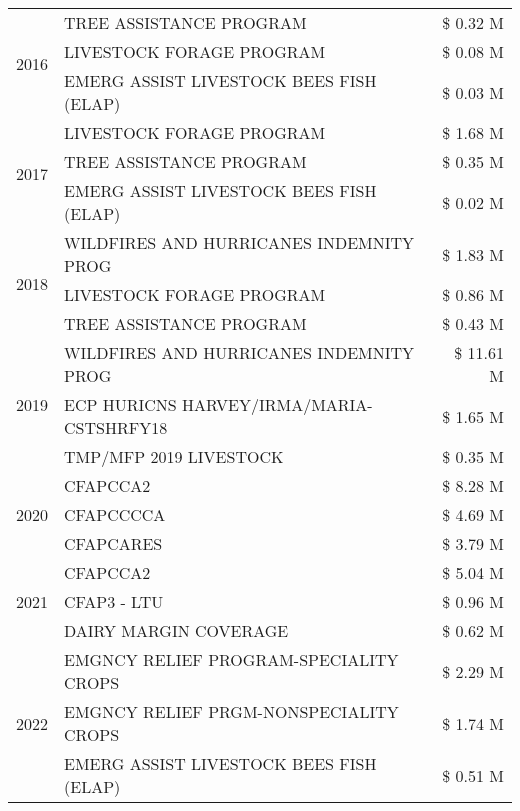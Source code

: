 \begin{tabular}{llr}
\cline{1-3}
\multirow[t]{3}{*}{2016} & TREE ASSISTANCE PROGRAM & \$ 0.32 M \\
 & LIVESTOCK FORAGE PROGRAM & \$ 0.08 M \\
 & EMERG ASSIST LIVESTOCK BEES FISH (ELAP) & \$ 0.03 M \\
\cline{1-3}
\multirow[t]{3}{*}{2017} & LIVESTOCK FORAGE PROGRAM & \$ 1.68 M \\
 & TREE ASSISTANCE PROGRAM & \$ 0.35 M \\
 & EMERG ASSIST LIVESTOCK BEES FISH (ELAP) & \$ 0.02 M \\
\cline{1-3}
\multirow[t]{3}{*}{2018} & WILDFIRES AND HURRICANES INDEMNITY PROG & \$ 1.83 M \\
 & LIVESTOCK FORAGE PROGRAM & \$ 0.86 M \\
 & TREE ASSISTANCE PROGRAM & \$ 0.43 M \\
\cline{1-3}
\multirow[t]{3}{*}{2019} & WILDFIRES AND HURRICANES INDEMNITY PROG & \$ 11.61 M \\
 & ECP HURICNS HARVEY/IRMA/MARIA-CSTSHRFY18 & \$ 1.65 M \\
 & TMP/MFP 2019 LIVESTOCK & \$ 0.35 M \\
\cline{1-3}
\multirow[t]{3}{*}{2020} & CFAPCCA2 & \$ 8.28 M \\
 & CFAPCCCCA & \$ 4.69 M \\
 & CFAPCARES & \$ 3.79 M \\
\cline{1-3}
\multirow[t]{3}{*}{2021} & CFAPCCA2 & \$ 5.04 M \\
 & CFAP3 - LTU & \$ 0.96 M \\
 & DAIRY MARGIN COVERAGE & \$ 0.62 M \\
\cline{1-3}
\multirow[t]{3}{*}{2022} & EMGNCY RELIEF PROGRAM-SPECIALITY CROPS & \$ 2.29 M \\
 & EMGNCY RELIEF PRGM-NONSPECIALITY CROPS & \$ 1.74 M \\
 & EMERG ASSIST LIVESTOCK BEES FISH (ELAP) & \$ 0.51 M \\
\cline{1-3}
\bottomrule
\end{tabular}
